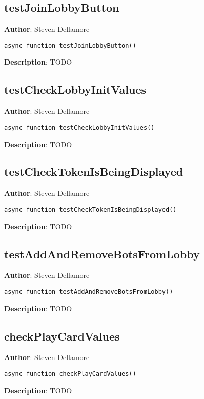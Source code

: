 \documentclass[12pt]{article}
\begin{document}
\subsection{testJoinLobbyButton}
\textbf{Author}: Steven Dellamore 
\vspace*{1\baselineskip}
\begin{lstlisting}
async function testJoinLobbyButton()
\end{lstlisting} 
\vspace*{1\baselineskip}
\textbf{Description}: TODO 



\subsection{testCheckLobbyInitValues}
\textbf{Author}: Steven Dellamore 
\vspace*{1\baselineskip}
\begin{lstlisting}
async function testCheckLobbyInitValues()
\end{lstlisting} 
\vspace*{1\baselineskip}
\textbf{Description}: TODO 



\subsection{testCheckTokenIsBeingDisplayed}
\textbf{Author}: Steven Dellamore 
\vspace*{1\baselineskip}
\begin{lstlisting}
async function testCheckTokenIsBeingDisplayed()
\end{lstlisting} 
\vspace*{1\baselineskip}
\textbf{Description}: TODO 



\subsection{testAddAndRemoveBotsFromLobby}
\textbf{Author}: Steven Dellamore 
\vspace*{1\baselineskip}
\begin{lstlisting}
async function testAddAndRemoveBotsFromLobby()
\end{lstlisting} 
\vspace*{1\baselineskip}
\textbf{Description}: TODO 



\subsection{checkPlayCardValues}
\textbf{Author}: Steven Dellamore 
\vspace*{1\baselineskip}
\begin{lstlisting}
async function checkPlayCardValues()
\end{lstlisting} 
\vspace*{1\baselineskip}
\textbf{Description}: TODO 
\end{document}
